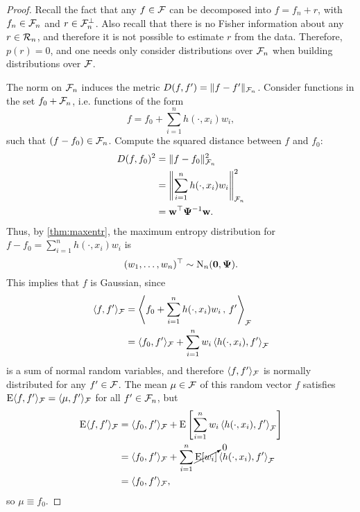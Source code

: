 \begin{proof}
  Recall the fact that any $f \in {\mathcal F}$ can be decomposed into $f = f_n + r$, with $f_n \in {\mathcal F}_n$ and $r \in {\mathcal F}_n^\bot$.
  Also recall that there is no Fisher information about any $r \in {\mathcal R}_n$, and therefore it is not possible to estimate $r$ from the data.
  Therefore, $p(r) = 0$, and one needs only consider distributions over ${\mathcal F}_n$ when building distributions over ${\mathcal F}$.
  
  The norm on ${\mathcal F}_n$ induces the metric $D(f,f') = \lVert f - f'\rVert_{{\mathcal F}_n}$.
  Consider functions in the set $f_0 + {\mathcal F}_n$, i.e. functions of the form
  \[
    f = f_0 + \sum_{i=1}^n h(\cdot,x_i)w_i,
  \]
  such that $(f - f_0) \in {\mathcal F}_n$. 
  Compute the squared distance between $f$ and $f_0$:
  \begin{align*}
    D(f,f_0)^2 
    &= \lVert f - f_0\rVert_{{\mathcal F}_n}^2 \\
    &= \left\Vert \sum_{i=1}^n h(\cdot,x_i)w_i \right\Vert_{{\mathcal F}_n}^2 \\
    &= {\mathbf w} ^\top{\bm\Psi}^{-1} {\mathbf w}.
  \end{align*}
  Thus, by \cref{thm:maxentr}, the maximum entropy distribution for $f - f_0 = \sum_{i=1}^n h(\cdot,x_i)w_i$ is
  \[
    (w_1,\dots,w_n)^\top \sim \operatorname{N}_n({\mathbf 0},{\bm\Psi}).
  \]
  This implies that $f$ is Gaussian, since
  \begin{align*}
    \langle f,f' \rangle_{{\mathcal F}}
    &= \left\langle f_0 + \sum_{i=1}^n h(\cdot,x_i)w_i \,,\, f' \right\rangle_{{\mathcal F}} \\
    &= \langle f_0,f'\rangle_{\mathcal F} +  \sum_{i=1}^n w_i \left\langle  h(\cdot,x_i), f' \right\rangle_{{\mathcal F}}  
  \end{align*}
  is a sum of normal random variables, and therefore $\langle f,f' \rangle_{{\mathcal F}}$ is normally distributed for any $f' \in {\mathcal F}$.
  The mean $\mu\in{\mathcal F}$ of this random vector $f$ satisfies $\operatorname{E}\langle f,f'\rangle_{{\mathcal F}}  = \langle\mu,f'\rangle_{{\mathcal F}}$ for all $f'\in{\mathcal F}_n$, but
  \vspace{-1.1em}
  \begin{align*}
    \operatorname{E}\langle f,f'\rangle_{{\mathcal F}}  
    &= \langle f_0,f' \rangle_{{\mathcal F}} + 
    \operatorname{E} \left[ \sum_{i=1}^n w_i \left\langle  h(\cdot,x_i), f' \right\rangle_{{\mathcal F}} \right] \\
    &= \langle f_0,f' \rangle_{{\mathcal F}} + 
     \sum_{i=1}^n \cancelto{0}{\operatorname{E} [w_i]} \left\langle  h(\cdot,x_i), f' \right\rangle_{{\mathcal F}} \\
    &= \langle f_0,f' \rangle_{{\mathcal F}},
  \end{align*}
  so $\mu \equiv f_0$. 
  

\end{proof}
